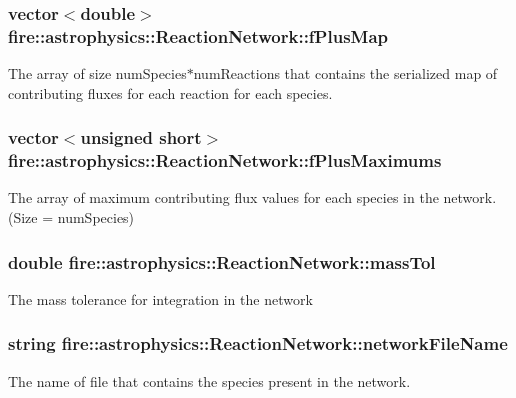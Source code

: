 \subsubsection[{\texorpdfstring{f\+Plus\+Map}{fPlusMap}}]{\setlength{\rightskip}{0pt plus 5cm}vector$<$double$>$ fire\+::astrophysics\+::\+Reaction\+Network\+::f\+Plus\+Map}\hypertarget{a00243_af3aa4184f759b2a8babf765667aa6604}{}\label{a00243_af3aa4184f759b2a8babf765667aa6604}
The array of size num\+Species$\ast$num\+Reactions that contains the serialized map of contributing fluxes for each reaction for each species. 
\subsubsection[{\texorpdfstring{f\+Plus\+Maximums}{fPlusMaximums}}]{\setlength{\rightskip}{0pt plus 5cm}vector$<$unsigned short$>$ fire\+::astrophysics\+::\+Reaction\+Network\+::f\+Plus\+Maximums}\hypertarget{a00243_a6682680b1f2975fa8dc1288d3c463693}{}\label{a00243_a6682680b1f2975fa8dc1288d3c463693}
The array of maximum contributing flux values for each species in the network. (Size = num\+Species) 
\subsubsection[{\texorpdfstring{mass\+Tol}{massTol}}]{\setlength{\rightskip}{0pt plus 5cm}double fire\+::astrophysics\+::\+Reaction\+Network\+::mass\+Tol}\hypertarget{a00243_ad3d95ecac758ca7efce6376904455123}{}\label{a00243_ad3d95ecac758ca7efce6376904455123}
The mass tolerance for integration in the network 
\subsubsection[{\texorpdfstring{network\+File\+Name}{networkFileName}}]{\setlength{\rightskip}{0pt plus 5cm}string fire\+::astrophysics\+::\+Reaction\+Network\+::network\+File\+Name}\hypertarget{a00243_abcc4209749ecd64d0ab9621210536ade}{}\label{a00243_abcc4209749ecd64d0ab9621210536ade}
The name of file that contains the species present in the network. 
